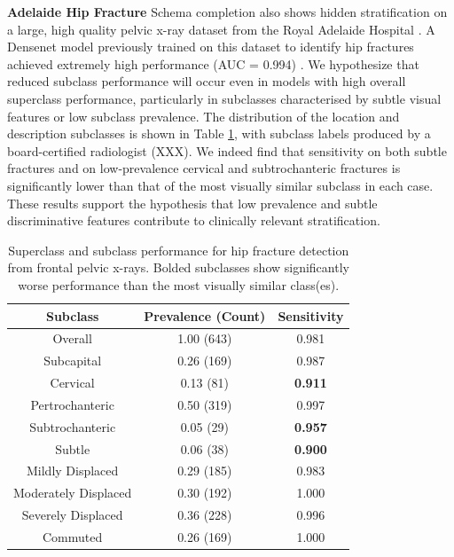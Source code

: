 \documentclass{article}
\begin{document}
\textbf{Adelaide Hip Fracture} Schema completion also shows hidden stratification on a large, high quality pelvic x-ray dataset from the Royal Adelaide Hospital \citep{Gale_W_Oakden-Rayner_L_Carneiro_G_Bradley_AP_Palmer_LJ2017-tl}.
 A Densenet model previously trained on this dataset to identify hip fractures achieved extremely high performance (AUC = 0.994) \citep{Gale_W_Oakden-Rayner_L_Carneiro_G_Bradley_AP_Palmer_LJ2017-tl}. 
  We hypothesize that reduced subclass performance will occur even in models with high overall superclass performance, particularly in subclasses characterised by subtle visual features or low subclass prevalence.  
 The distribution of the location and description subclasses is shown in Table \ref{tab:hip1}, with subclass labels produced by a board-certified radiologist (XXX).  
 We indeed find that sensitivity on both subtle fractures and on low-prevalence cervical and subtrochanteric fractures is significantly lower than that of the most visually similar subclass in each case.
These results support the hypothesis that low prevalence and subtle discriminative features contribute to clinically relevant stratification.  
 
\begin{table}[htb!]
\centering
\begin{tabular}{|c|c|c|}
\hline
 Subclass & Prevalence (Count) & Sensitivity \\
 \hline
 Overall & 1.00 (643) & 0.981  \\
 Subcapital & 0.26 (169) & 0.987   \\
 Cervical & 0.13 (81) & \textbf{0.911}\\
 Pertrochanteric & 0.50 (319)  & 0.997\\
 Subtrochanteric & 0.05 (29) & \textbf{0.957} \\
 Subtle & 0.06 (38) & \textbf{0.900}\\
 Mildly Displaced & 0.29 (185) & 0.983\\
 Moderately Displaced & 0.30 (192) & 1.000\\
 Severely Displaced & 0.36 (228) & 0.996\\
 Commuted & 0.26 (169) & 1.000 \\ 
 \hline
\end{tabular}
\caption{Superclass and subclass performance for hip fracture detection from frontal pelvic x-rays. Bolded subclasses show significantly worse performance than the most visually similar class(es).}
\label{tab:hip1}
\vspace{-6mm}
\end{table}
\end{document}
